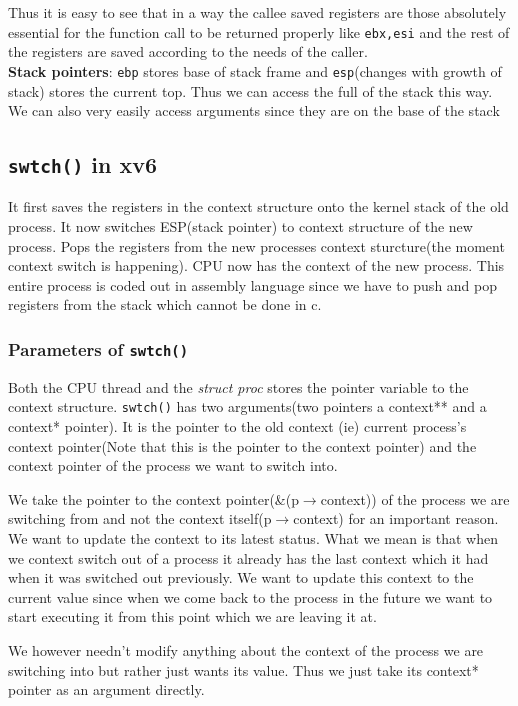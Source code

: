 \documentclass[12pt]{article}
\begin{document}
Thus it is easy to see that in a way the callee saved registers are those absolutely essential for the function call to be returned properly like \texttt{ebx,esi} and the rest of the
registers are saved according to the needs of the caller.
\\\textbf{Stack pointers}: \texttt{ebp} stores base of stack frame and \texttt{esp}(changes with growth of stack) stores the current top. Thus we can access the full of the stack this way.
We can also very easily access arguments since they are on the base of the stack

\subsection{\texttt{swtch()} in xv6}
It first saves the registers in the context structure onto the kernel stack of the old process.
It now switches ESP(stack pointer) to context structure of the new process. Pops the registers from the new processes context sturcture(the moment context switch is happening).
CPU now has the context of the new process. This entire process is coded out in assembly language since we have to push and pop
registers from the stack which cannot be done in c.



\subsubsection{Parameters of \texttt{swtch()}}
Both the CPU thread and the \textit{struct proc} stores the pointer variable to the
context structure. \texttt{swtch()} has two arguments(two pointers a context** and a context* pointer). It is the pointer to the old context (ie) current 
process's context pointer(Note that this is the pointer to the context pointer) and the context pointer of the process we want to switch into. 


We take the pointer to the context pointer(\&(p$\rightarrow$context)) of the process we are switching from and not the context itself(p$\rightarrow$context)
for an important reason. We want to update the context to its latest status. What we mean is that when we context switch out of a process it already has the last context which
it had when it was switched out previously. We want to update this context to the current value since when we come back to the process in the future we want to start executing it from
this point which we are leaving it at.

We however needn't modify anything about the context of the process we are switching into but rather just wants its value. Thus we just take its context* pointer as an argument
directly.
\end{document}

